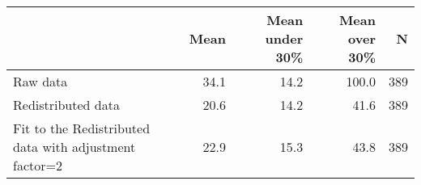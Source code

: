 \begin{table}[ht]
\centering
\begin{tabular}{lrrrr}
  \hline
 & Mean & Mean under 30\% & Mean over 30\% & N \\ 
  \hline
Raw data & 34.1 & 14.2 & 100.0 & 389 \\ 
  Redistributed data & 20.6 & 14.2 & 41.6 & 389 \\ 
  Fit to the Redistributed data with adjustment factor=2 & 22.9 & 15.3 & 43.8 & 389 \\ 
   \hline
\end{tabular}
\end{table}
